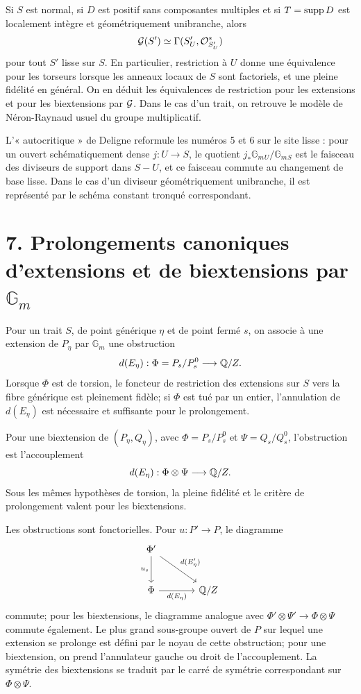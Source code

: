 \documentclass[11pt]{article}
\providecommand{\Gm}{\mathbb G_m}
\begin{document}
Si \(S\) est normal, si \(D\) est positif sans composantes multiples et si \(T=\operatorname{supp} D\) est localement intègre et géométriquement unibranche, alors
\[
  \mathcal G(S')\simeq \Gamma(S'_U,\mathcal O^*_{S'_U})
\]
pour tout \(S'\) lisse sur \(S\).  En particulier, restriction à \(U\) donne une équivalence pour les torseurs lorsque les anneaux locaux de \(S\) sont factoriels, et une pleine fidélité en général.  On en déduit les équivalences de restriction pour les extensions et pour les biextensions par \(\mathcal G\).  Dans le cas d'un trait, on retrouve le modèle de Néron-Raynaud usuel du groupe multiplicatif.

L'« autocritique » de Deligne reformule les numéros 5 et 6 sur le site lisse : pour un ouvert schématiquement dense \(j:U\to S\), le quotient \(j_*\Gm{}_{U}/\Gm{}_{S}\) est le faisceau des diviseurs de support dans \(S-U\), et ce faisceau commute au changement de base lisse.  Dans le cas d'un diviseur géométriquement unibranche, il est représenté par le schéma constant tronqué correspondant.

\section*{7. Prolongements canoniques d'extensions et de biextensions par \(\Gm\)}

Pour un trait \(S\), de point générique \(\eta\) et de point fermé \(s\), on associe à une extension de \(P_\eta\) par \(\Gm\) une obstruction
\[
  d(E_\eta):\Phi=P_s/P_s^0\longrightarrow \mathbb Q/Z.
\]
Lorsque \(\Phi\) est de torsion, le foncteur de restriction des extensions sur \(S\) vers la fibre générique est pleinement fidèle; si \(\Phi\) est tué par un entier, l'annulation de \(d(E_\eta)\) est nécessaire et suffisante pour le prolongement.

Pour une biextension de \((P_\eta,Q_\eta)\), avec \(\Phi=P_s/P_s^0\) et \(\Psi=Q_s/Q_s^0\), l'obstruction est l'accouplement
\[
  d(E_\eta):\Phi\otimes\Psi\longrightarrow \mathbb Q/Z.
\]
Sous les mêmes hypothèses de torsion, la pleine fidélité et le critère de prolongement valent pour les biextensions.

Les obstructions sont fonctorielles.  Pour \(u:P'\to P\), le diagramme
\[
\begin{tikzcd}[column sep=large,row sep=large]
\Phi' \arrow[d,"u_s"'] \arrow[dr,"d(E'_\eta)"]&\\
\Phi \arrow[r,"d(E_\eta)"']&\QQ/Z
\end{tikzcd}
\]
commute; pour les biextensions, le diagramme analogue avec \(\Phi'\otimes\Psi'\to\Phi\otimes\Psi\) commute également.  Le plus grand sous-groupe ouvert de \(P\) sur lequel une extension se prolonge est défini par le noyau de cette obstruction; pour une biextension, on prend l'annulateur gauche ou droit de l'accouplement.  La symétrie des biextensions se traduit par le carré de symétrie correspondant sur \(\Phi\otimes\Psi\).
\end{document}
